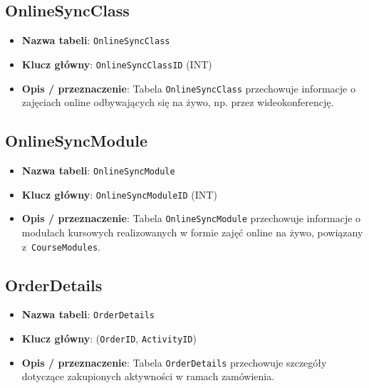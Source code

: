 \documentclass[12pt]{article}
\begin{document}
\subsection{OnlineSyncClass}
\begin{itemize}
    \item \textbf{Nazwa tabeli}: \texttt{OnlineSyncClass}
    \item \textbf{Klucz główny}: \texttt{OnlineSyncClassID} (INT)
    \item \textbf{Opis / przeznaczenie}:  
          Tabela \texttt{OnlineSyncClass} przechowuje informacje o zajęciach online odbywających się na żywo, np. przez wideokonferencję.
\end{itemize}

\subsection{OnlineSyncModule}
\begin{itemize}
    \item \textbf{Nazwa tabeli}: \texttt{OnlineSyncModule}
    \item \textbf{Klucz główny}: \texttt{OnlineSyncModuleID} (INT)
    \item \textbf{Opis / przeznaczenie}:  
          Tabela \texttt{OnlineSyncModule} przechowuje informacje o modułach kursowych realizowanych w formie zajęć online na żywo, powiązany z~\texttt{CourseModules}.
\end{itemize}

\subsection{OrderDetails}
\begin{itemize}
    \item \textbf{Nazwa tabeli}: \texttt{OrderDetails}
    \item \textbf{Klucz główny}: (\texttt{OrderID}, \texttt{ActivityID})
    \item \textbf{Opis / przeznaczenie}:  
          Tabela \texttt{OrderDetails} przechowuje szczegóły dotyczące zakupionych aktywności w ramach zamówienia.
\end{itemize}

\newpage
\end{document}
